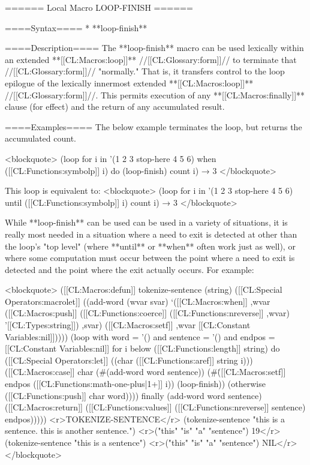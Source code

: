 ====== Local Macro LOOP-FINISH ======

====Syntax====
  * **loop-finish**

====Description====
The **loop-finish** macro can be used lexically within an extended **[[CL:Macros:loop]]** //[[CL:Glossary:form]]// to terminate that //[[CL:Glossary:form]]// "normally." That is, it transfers control to the loop epilogue of the lexically innermost extended **[[CL:Macros:loop]]** //[[CL:Glossary:form]]//. This permits execution of any **[[CL:Macros:finally]]** clause (for effect) and the return of any accumulated result.

====Examples====
The below example terminates the loop, but returns the accumulated count. 

<blockquote> 
(loop for i in '(1 2 3 stop-here 4 5 6) 
      when ([[CL:Functions:symbolp]] i) 
        do (loop-finish)
      count i) → 3
</blockquote>

This loop is equivalent to: 
<blockquote> 
(loop for i in '(1 2 3 stop-here 4 5 6)
      until ([[CL:Functions:symbolp]] i) 
      count i) → 3
</blockquote>


While **loop-finish** can be used can be used in a variety of situations, it is really most needed in a situation where a need to exit is detected at other than the loop's "top level" (where **until** or **when** often work just as well), or where some computation must occur between the point where a need to exit is detected and the point where the exit actually occurs. For example:

<blockquote>
([[CL:Macros:defun]] tokenize-sentence (string) 
  ([[CL:Special Operators:macrolet]] ((add-word (wvar svar) 
              `([[CL:Macros:when]] ,wvar 
                 ([[CL:Macros:push]] ([[CL:Functions:coerce]] ([[CL:Functions:nreverse]] ,wvar) '[[CL:Types:string]]) ,svar) 
                 ([[CL:Macros:setf]] ,wvar [[CL:Constant Variables:nil]]))))
    (loop with word = '() and sentence = '() and endpos = [[CL:Constant Variables:nil]] 
          for i below ([[CL:Functions:length]] string) 
          do ([[CL:Special Operators:let]] ((char ([[CL:Functions:aref]] string i)))
               ([[CL:Macros:case]] char 
                 (#\Space (add-word word sentence))
                 (#\. ([[CL:Macros:setf]] endpos ([[CL:Functions:math-one-plus|1+]] i)) (loop-finish))
                 (otherwise ([[CL:Functions:push]] char word))))
          finally (add-word word sentence) 
                  ([[CL:Macros:return]] ([[CL:Functions:values]] ([[CL:Functions:nreverse]] sentence) endpos))))) <r>TOKENIZE-SENTENCE</r>
(tokenize-sentence "this is a sentence. this is another sentence.") <r>("this" "is" "a" "sentence")
19</r>
(tokenize-sentence "this is a sentence") <r>("this" "is" "a" "sentence")
NIL</r>
</blockquote>

